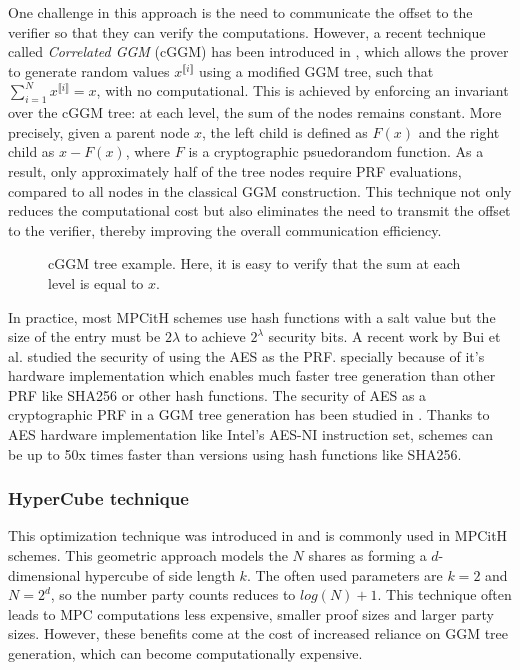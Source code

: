 \documentclass[english]{article}
\newcommand{\lir}{\llbracket i \rrbracket}
\begin{document}
		One challenge in this approach is the need to communicate the offset to the verifier so that they can verify the computations. However, a recent technique called \emph{Correlated GGM} (cGGM) has been introduced in \cite{GYWZ+22}, which allows the prover to generate random values $x^{\lir}$ using a modified GGM tree, such that $\sum_{i=1}^{N} x^{\lir} = x$, with no computational.
		This is achieved by enforcing an invariant over the cGGM tree: at each level, the sum of the nodes remains constant. More precisely, given a parent node $x$, the left child is defined as $F(x)$ and the right child as $x - F(x)$, where $F$ is a cryptographic psuedorandom function. As a result, only approximately half of the tree nodes require PRF evaluations, compared to all nodes in the classical GGM construction.
		This technique not only reduces the computational cost but also eliminates the need to transmit the offset to the verifier, thereby improving the overall communication efficiency.
		
		\begin{figure}[H]
		\begin{center}
			\caption{cGGM tree example. Here, it is easy to verify that the sum at each level is equal to $x$.}
			\label{fig:cGGMtree}
		\end{center}
		\end{figure}
		
		In practice, most MPCitH schemes use hash functions with a salt value but the size of the entry must be $2\lambda$ to achieve $2^{\lambda}$ security bits. A recent work by Bui et al. studied the security of using the AES as the PRF. specially because of it's hardware implementation which enables much faster tree generation than other PRF like SHA256 or other hash functions. The security of AES as a cryptographic PRF in a GGM tree generation has been studied in \cite{BCCG+24}. Thanks to AES hardware implementation like Intel's AES-NI instruction set, schemes can be up to 50x times faster than versions using hash functions like SHA256.
		
		\subsubsection{HyperCube technique}
 		This optimization technique was introduced in \cite{AGHH+22} and is commonly used in MPCitH schemes. This geometric approach models the $N$ shares as forming a $d$-dimensional hypercube of side length $k$. The often used parameters are $k = 2$ and $N = 2^d$, so the number party counts reduces to $log(N) + 1$. This technique often leads to MPC computations less expensive, smaller proof sizes and larger party sizes. However, these benefits come at the cost of increased reliance on GGM tree generation, which can become computationally expensive.
		
\end{document}
